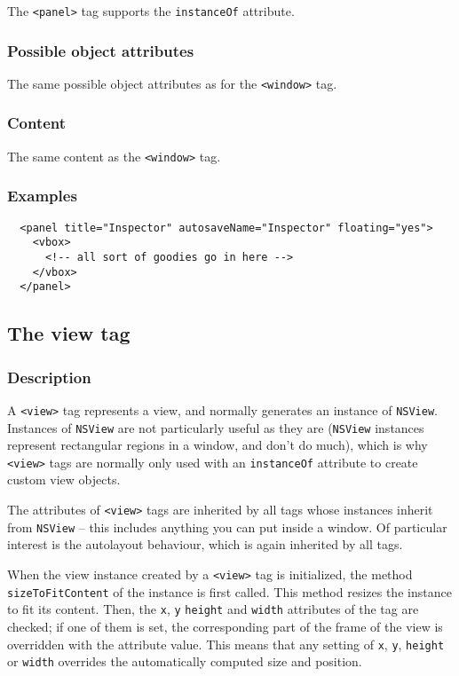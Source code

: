 The \texttt{<panel>} tag supports the \texttt{instanceOf} attribute.

\subsubsection{Possible object attributes}
The same possible object attributes as for the \texttt{<window>} tag.

\subsubsection{Content}
The same content as the \texttt{<window>} tag.

\subsubsection{Examples}
\begin{verbatim}
  <panel title="Inspector" autosaveName="Inspector" floating="yes">
    <vbox>
      <!-- all sort of goodies go in here -->
    </vbox>
  </panel>
\end{verbatim}

\subsection{The view tag}

\subsubsection{Description}
A \texttt{<view>} tag represents a view, and normally generates an
instance of \texttt{NSView}.  Instances of \texttt{NSView} are not
particularly useful as they are (\texttt{NSView} instances represent
rectangular regions in a window, and don't do much), which is why
\texttt{<view>} tags are normally only used with an \texttt{instanceOf}
 attribute to create custom view objects.

The attributes of \texttt{<view>} tags are inherited by all tags whose
instances inherit from \texttt{NSView} -- this includes anything you
can put inside a window.  Of particular interest is the autolayout
behaviour, which is again inherited by all tags.

When the view instance created by a \texttt{<view>} tag is
initialized, the method \texttt{sizeToFitContent} of the instance is
first called.  This method resizes the instance to fit its content.
Then, the \texttt{x}, \texttt{y} \texttt{height} and \texttt{width}
attributes of the tag are checked; if one of them is set, the
corresponding part of the frame of the view is overridden with the
attribute value.  This means that any setting of \texttt{x},
\texttt{y}, \texttt{height} or \texttt{width} overrides the
automatically computed size and position.

